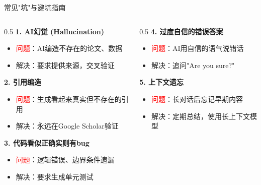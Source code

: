 \documentclass[aspectratio=169,11pt]{beamer}
\begin{document}
\begin{frame}{常见"坑"与避坑指南}
    \begin{columns}
        \begin{column}{0.5\textwidth}
            \textbf{1. AI幻觉 (Hallucination)}
            \begin{itemize}
                \item \textcolor{red}{问题}：AI编造不存在的论文、数据
                \item \textcolor{green!60!black}{解决}：要求提供来源，交叉验证
            \end{itemize}
            
            \vspace{0.2cm}
            \textbf{2. 引用编造}
            \begin{itemize}
                \item \textcolor{red}{问题}：生成看起来真实但不存在的引用
                \item \textcolor{green!60!black}{解决}：永远在Google Scholar验证
            \end{itemize}
            
            \vspace{0.2cm}
            \textbf{3. 代码看似正确实则有bug}
            \begin{itemize}
                \item \textcolor{red}{问题}：逻辑错误、边界条件遗漏
                \item \textcolor{green!60!black}{解决}：要求生成单元测试
            \end{itemize}
        \end{column}
        \begin{column}{0.5\textwidth}
            \textbf{4. 过度自信的错误答案}
            \begin{itemize}
                \item \textcolor{red}{问题}：AI用自信的语气说错话
                \item \textcolor{green!60!black}{解决}：追问"Are you sure?"
            \end{itemize}
            
            \vspace{0.2cm}
            \textbf{5. 上下文遗忘}
            \begin{itemize}
                \item \textcolor{red}{问题}：长对话后忘记早期内容
                \item \textcolor{green!60!black}{解决}：定期总结，使用长上下文模型
            \end{itemize}
            

\end{column}
\end{columns}
\end{frame}
\end{document}

